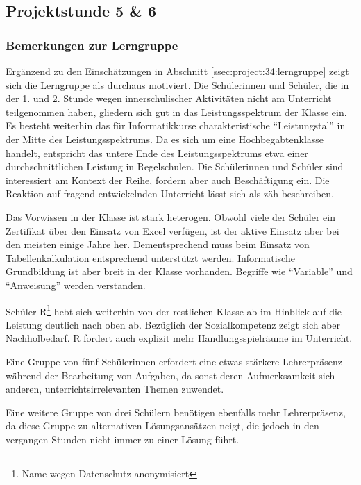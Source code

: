 \subsection{Projektstunde 5 \& 6}\steffen
\subsubsection{Bemerkungen zur Lerngruppe}
Ergänzend zu den Einschätzungen in Abschnitt \ref{ssec:project:34:lerngruppe} zeigt sich die Lerngruppe als durchaus motiviert. Die Schülerinnen und Schüler, die in der 1. und 2. Stunde wegen innerschulischer Aktivitäten nicht am Unterricht teilgenommen haben, gliedern sich gut in das Leistungsspektrum der Klasse ein. Es besteht weiterhin das für Informatikkurse charakteristische ``Leistungstal'' in der Mitte des Leistungsspektrums. Da es sich um eine Hochbegabtenklasse handelt, entspricht das untere Ende des Leistungsspektrums etwa einer durchschnittlichen Leistung in Regelschulen. Die Schülerinnen und Schüler sind interessiert am Kontext der Reihe, fordern aber auch Beschäftigung ein. Die Reaktion auf fragend-entwickelnden Unterricht lässt sich als zäh beschreiben. 

Das Vorwissen in der Klasse ist stark heterogen. Obwohl viele der Schüler ein Zertifikat über den Einsatz von Excel verfügen, ist der aktive Einsatz aber bei den meisten einige Jahre her. Dementsprechend muss beim Einsatz von Tabellenkalkulation entsprechend unterstützt werden. Informatische Grundbildung ist aber breit in der Klasse vorhanden. Begriffe wie ``Variable'' und ``Anweisung'' werden verstanden. 

Schüler R\footnote{Name wegen Datenschutz anonymisiert} hebt sich weiterhin von der restlichen Klasse ab im Hinblick auf die Leistung deutlich nach oben ab. Bezüglich der Sozialkompetenz zeigt sich aber Nachholbedarf. R fordert auch explizit mehr Handlungsspielräume im Unterricht.

Eine Gruppe von fünf Schülerinnen erfordert eine etwas stärkere Lehrerpräsenz während der Bearbeitung von Aufgaben, da sonst deren Aufmerksamkeit sich anderen, unterrichtsirrelevanten Themen zuwendet. 

Eine weitere Gruppe von drei Schülern benötigen ebenfalls mehr Lehrerpräsenz, da diese Gruppe zu alternativen Lösungsansätzen neigt, die jedoch in den vergangen Stunden nicht immer zu einer Lösung führt.
